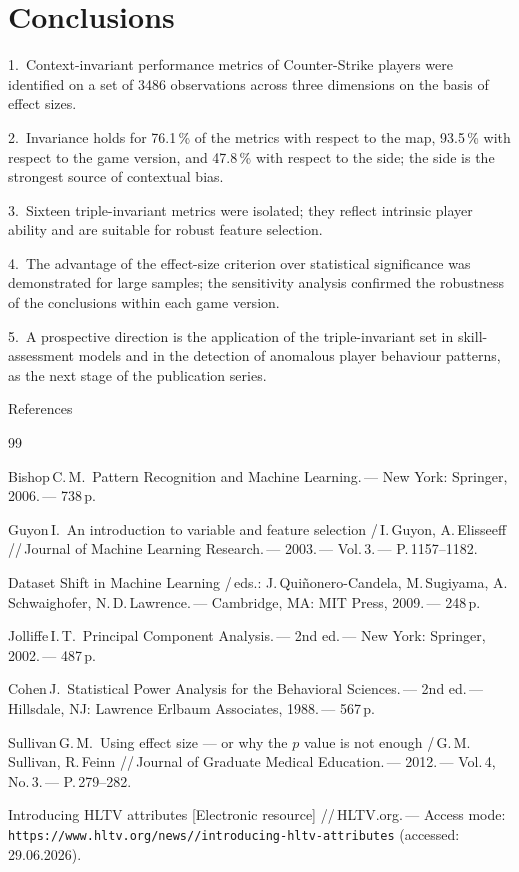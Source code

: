 \section{Conclusions}

1.~Context-invariant performance metrics of Counter-Strike players were identified on a set of
3486 observations across three dimensions on the basis of effect sizes.

2.~Invariance holds for 76.1\,\% of the metrics with respect to the map, 93.5\,\% with respect to
the game version, and 47.8\,\% with respect to the side; the side is the strongest source of
contextual bias.

3.~Sixteen triple-invariant metrics were isolated; they reflect intrinsic player ability and are
suitable for robust feature selection.

4.~The advantage of the effect-size criterion over statistical significance was demonstrated for
large samples; the sensitivity analysis confirmed the robustness of the conclusions within each
game version.

5.~A prospective direction is the application of the triple-invariant set in skill-assessment
models and in the detection of anomalous player behaviour patterns, as the next stage of the
publication series.

\vspace*{6pt}
\centerline{\normalfont\large\sc References}
\vspace*{3pt}

\begin{thebibliography}{99}
\begin{small}

Bishop\,C.\,M.\ Pattern Recognition and Machine Learning.\,--- New York: Springer, 2006.\,--- 738\,p.

Guyon\,I.\ An introduction to variable and feature selection /\,I.\,Guyon, A.\,Elisseeff
//\,Journal of Machine Learning Research.\,--- 2003.\,--- Vol.\,3.\,--- P.\,1157--1182.

Dataset Shift in Machine Learning /\,eds.: J.\,Qui\~nonero-Candela, M.\,Sugiyama,
A.\,Schwaighofer, N.\,D.\,Lawrence.\,--- Cambridge, MA: MIT Press, 2009.\,--- 248\,p.

Jolliffe\,I.\,T.\ Principal Component Analysis.\,--- 2nd ed.\,--- New York: Springer,
2002.\,--- 487\,p.

Cohen\,J.\ Statistical Power Analysis for the Behavioral Sciences.\,--- 2nd ed.\,---
Hillsdale, NJ: Lawrence Erlbaum Associates, 1988.\,--- 567\,p.

Sullivan\,G.\,M.\ Using effect size --- or why the $p$ value is not enough /\,G.\,M.\,Sullivan,
R.\,Feinn //\,Journal of Graduate Medical Education.\,--- 2012.\,--- Vol.\,4, No.\,3.\,---
P.\,279--282.

Introducing HLTV attributes [Electronic resource] //\,HLTV.org.\,--- Access mode:
\texttt{https://\ab www.hltv.org/\ab news//\ab introducing-hltv-attributes}
(accessed: 29.06.2026).

\end{small}
\end{thebibliography}

